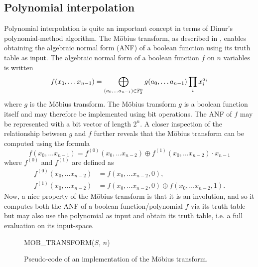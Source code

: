 \subsection{Polynomial interpolation} \label{sec:prereq:poly_interp}
Polynomial interpolation is quite an important concept in terms of Dinur's polynomial-method algorithm. The Möbius transform, as described in \cite{joux2009algorithmic}, enables obtaining the algebraic normal form (ANF) of a boolean function using its truth table as input. The algebraic normal form of a boolean function $f$ on $n$ variables is written
$$
    f(x_0, \dots x_{n - 1}) = \bigoplus_{(a_0,\dots a_{n - 1}) \in \mathbb{F}_2^n} g(a_0, \dots a_{n - 1}) \prod_i x_i^{a_i}
$$
where $g$ is the Möbius transform. The Möbius transform $g$ is a boolean function itself and may therefore be implemented using bit operations. The ANF of $f$ may be represented with a bit vector of length $2^n$. A closer inspection of the relationship between $g$ and $f$ further reveals that the Möbius transform can be computed using the formula
$$
    f(x_0, \dots x_{n - 1}) = f^{(0)}(x_0, \dots x_{n - 2}) \oplus f^{(1)}(x_0, \dots x_{n - 2}) \cdot x_{n - 1}
$$
where $f^{(0)}$ and $f^{(1)}$ are defined as 
\begin{equation*}
    \begin{split}
        f^{(0)}(x_0, \dots x_{n - 2}) &= f(x_0, \dots x_{n - 2}, 0), \\
        f^{(1)}(x_0, \dots x_{n - 2}) &= f(x_0, \dots x_{n - 2}, 0) \oplus f(x_0, \dots x_{n - 2}, 1).
    \end{split}
\end{equation*}
Now, a nice property of the Möbius transform is that it is an involution, and so it computes both the ANF of a boolean function/polynomial $f$ via its truth table but may also use the polynomial as input and obtain its truth table, i.e. a full evaluation on its input-space.

\begin{figure}[ht]
    \begin{alg}
        \caption{MOB\_TRANSFORM($S$, $n$)}
    \end{alg}
    \caption{Pseudo-code of an implementation of the Möbius transform.}
    \label{alg:mob}
\end{figure}

